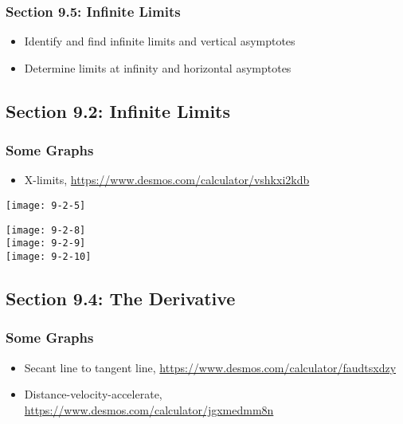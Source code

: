 \documentclass[14pt]{extarticle}
\begin{document}
\subsubsection*{Section 9.5: Infinite Limits}
\begin{itemize}
	\item Identify and find infinite limits and vertical asymptotes
	\item Determine limits at infinity and horizontal asymptotes
\end{itemize}



\cleardoublepage



\subsection*{Section 9.2: Infinite Limits}
\subsubsection*{Some Graphs}
\begin{itemize}
	\item X-limits, \url{https://www.desmos.com/calculator/vshkxi2kdb}
\end{itemize}
\begin{center}
\texttt{[image: 9-2-5]} \\
\end{center}


\begin{center}
\texttt{[image: 9-2-8]} \\
\texttt{[image: 9-2-9]} \\
\texttt{[image: 9-2-10]} \\
\end{center}

\cleardoublepage

\subsection*{Section 9.4: The Derivative}
\subsubsection*{Some Graphs}
\begin{itemize}
	\item Secant line to tangent line, \url{https://www.desmos.com/calculator/faudtsxdzy}
	\item Distance-velocity-accelerate, \url{https://www.desmos.com/calculator/jgxmedmm8n}
\end{itemize}
\end{document}
